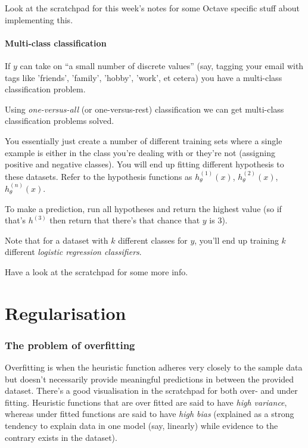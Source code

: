 Look at the scratchpad for this week's notes for some Octave specific stuff about implementing this.

\subsubsection{Multi-class classification}

If $y$ can take on ``a small number of discrete values'' (say, tagging your email with tags like 'friends', 'family', 'hobby', 'work', et cetera) you have a multi-class classification problem.

Using \emph{one-versus-all} (or one-versus-rest) classification we can get multi-class classification problems solved.

You essentially just create a number of different training sets where a single example is either in the class you're dealing with or they're not (assigning positive and negative classes). You will end up fitting different hypothesis to these datasets. Refer to the hypothesis functions as $h_\theta^{(1)}(x)$, $h_\theta^{(2)}(x)$, $h_\theta^{(n)}(x)$.

To make a prediction, run all hypotheses and return the highest value (so if that's $h^{(3)}$ then return that there's that chance that $y$ is 3).

Note that for a dataset with $k$ different classes for $y$, you'll end up training $k$ different \emph{logistic regression classifiers}.

Have a look at the scratchpad for some more info.

\chapter{Regularisation}
\subsection{The problem of overfitting}
Overfitting is when the heuristic function adheres very closely to the sample data but doesn't necessarily provide meaningful predictions in between the provided dataset. There's a good visualisation in the scratchpad for both over- and under fitting. Heuristic functions that are over fitted are said to have \emph{high variance}, whereas under fitted functions are said to have \emph{high bias} (explained as a strong tendency to explain data in one model (say, linearly) while evidence to the contrary exists in the dataset).

